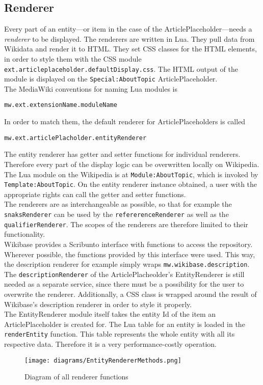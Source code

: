 \subsection{Renderer}

Every part of an entity---or item in the case of the ArticlePlaceholder---needs a \textit{renderer} to be displayed. The renderers are written in Lua. They pull data from Wikidata and render it to HTML. They set CSS classes for the HTML elements, in order to style them with the CSS module \texttt{\justify ext.articleplaceholder.defaultDisplay.css}. The HTML output of the module is displayed on the \texttt{\justify Special:AboutTopic} ArticlePlaceholder. \\
The MediaWiki conventions for naming Lua modules is 
\begin{center}
\texttt{\justify mw.ext.extensionName.moduleName} 
\end{center}
In order to match them, the default renderer for ArticlePlaceholders is called 
\begin{center}
\texttt{\justify mw.ext.articlePlacholder.entityRenderer}
\end{center}
The entity renderer has getter and setter functions for individual renderers. Therefore every part of the display logic can be overwritten locally on Wikipedia. \\
The Lua module on the Wikipedia is at \texttt{\justify Module:AboutTopic}, which is invoked by \texttt{\justify Template:AboutTopic}. On the entity renderer instance obtained, a user with the appropriate rights can call the getter and setter functions. \\
The renderers are as interchangeable as possible, so that for example the \texttt{\justify snaksRenderer} can be used by the \texttt{\justify refererenceRenderer} as well as the \texttt{\justify qualifierRenderer}. The scopes of the renderers are therefore limited to their functionality. \\
Wikibase provides a Scribunto interface with functions to access the repository. Wherever possible, the functions provided by this interface were used. This way, the description renderer for example simply wraps \texttt{\justify mw.wikibase.description}. The \texttt{\justify descriptionRenderer} of the ArticlePlacheolder's EntityRenderer is still needed as a separate service, since there must be a possibility for the user to overwrite the renderer. Additionally, a CSS class is wrapped around the result of Wikibase's description renderer in order to style it properly. \\
The EntityRenderer module itself takes the entity Id of the item an ArticlePlaceholder is created for. The Lua table for an entity is loaded in the \texttt{\justify renderEntity} function. This table represents the whole entity with all its respective data. Therefore it is a very performance-costly operation. \\

\begin{figure}[H]
	\centering
	\texttt{[image: diagrams/EntityRendererMethods.png]}
	\caption{Diagram of all renderer functions}
	\label{fig:renderer}
\end{figure}